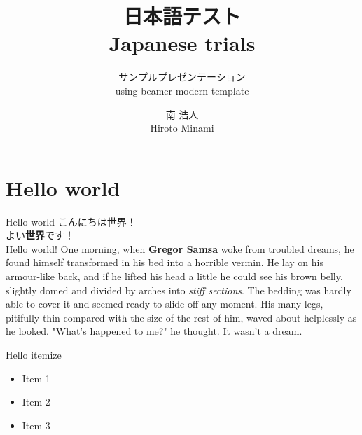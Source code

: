 \documentclass[lualatex]{beamer}
\title
    {日本語テスト \\ Japanese trials}
\subtitle
    {サンプルプレゼンテーション \\ using beamer-modern template}
\author
    {南 浩人 \\ Hiroto Minami}
\begin{document}
    \frame[plain]{\titlepage}

    \frame{\tableofcontents}

    \section{Hello world}

    \begin{frame}{Hello world}
        こんにちは世界！ \\
        よい{\bf 世界}です！ \\
        Hello world! One morning, when \textbf{Gregor Samsa}
        woke from troubled dreams, he found himself
        transformed in his bed into a horrible vermin.
        He lay on his armour-like back, and if he
        lifted his head a little he could see his brown
        belly, slightly domed and divided by arches
        into \textit{stiff sections}. The bedding was hardly
        able to cover it and seemed ready to slide off
        any moment. His many legs, pitifully thin
        compared with the size of the rest of him,
        waved about helplessly as he looked. "What's
        happened to me?" he thought. It wasn't a dream.
    \end{frame}


    \begin{frame}{Hello itemize}
        \begin{itemize}
            \item Item 1
            \item Item 2
            \item Item 3
        \end{itemize}
    \end{frame}

    \begin{comment}
    \begin{frame}{Hello enumerate}
        \begin{enumerate}
            \item Item 1
            \item Item 2
            \item Item 3
        \end{enumerate}
    \end{frame}
\end{comment}
\end{document}
